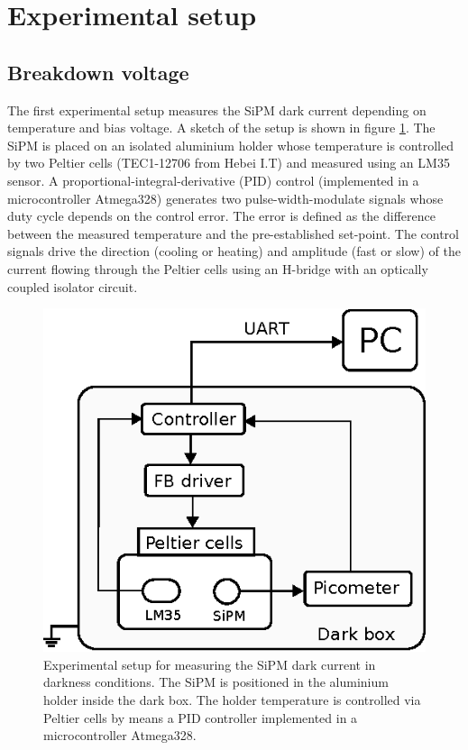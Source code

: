 \documentclass[a4paper,11pt]{article}
\begin{document}
\section{Experimental setup}
\label{sec:exp}

\subsection{Breakdown voltage}

The first experimental setup measures the SiPM dark current depending on temperature and bias voltage. A sketch of the setup is shown in figure \ref{fig:setup1}. The SiPM is placed on an isolated aluminium holder whose temperature is controlled by two Peltier cells (TEC1-12706 from Hebei I.T) and measured using an LM35 sensor. A proportional-integral-derivative (PID) control (implemented in a microcontroller Atmega328) generates two pulse-width-modulate signals whose duty cycle depends on the control error. The error is defined as the difference between the measured temperature and the pre-established set-point. The control signals drive the direction (cooling or heating) and amplitude (fast or slow) of the current flowing through the Peltier cells using an H-bridge with an optically coupled isolator circuit. 


\begin{figure}[htbp]
\centering %
\includegraphics[width=.5\textwidth]{Figures/ExpSet1.eps}
\caption{\label{fig:setup1} Experimental setup for measuring the SiPM dark current in darkness conditions. The SiPM is positioned in the aluminium holder inside the dark box. The holder temperature is controlled via Peltier cells by means a PID controller implemented in a microcontroller Atmega328.}
\end{figure}
\end{document}
